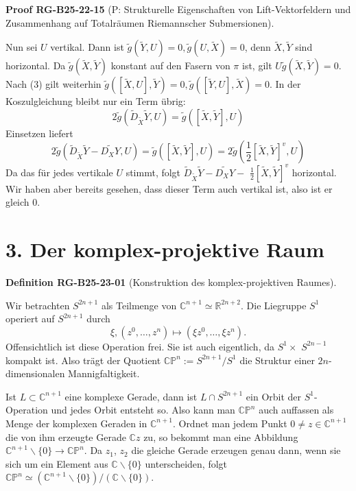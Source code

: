 \documentclass[10pt, letterpaper]{article}
\newcommand{\CustomHeading}[3]{%
  \par\medskip\noindent%
  \textbf{#1 #2} \textnormal{(#3)}.\enskip%
}
\newenvironment{DEF}[2]{\begin{unitbox}\CustomHeading{Definition}{#1}{#2}}{\end{unitbox}}
\newenvironment{PROOF}[2]{\begin{unitbox}\CustomHeading{Proof}{#1}{#2}}{\end{unitbox}}
\begin{document}
\begin{PROOF}{RG-B25-22-15}{P: Strukturelle Eigenschaften von Lift-Vektorfeldern und Zusammenhang auf Totalräumen Riemannscher Submersionen}
Nun sei $U$ vertikal. Dann ist $\tilde{g}(\tilde{Y}, U)=0, \tilde{g}(U, \tilde{X})=0$, denn $\tilde{X}, \tilde{Y}$ sind horizontal. Da $\tilde{g}(\tilde{X}, \tilde{Y})$ konstant auf den Fasern von $\pi$ ist, gilt $U \tilde{g}(\tilde{X}, \tilde{Y})=0$. Nach (3) gilt weiterhin $\tilde{g}([\tilde{X}, U], \tilde{Y})=0, \tilde{g}([\tilde{Y}, U], \tilde{X})=0$. In der Koszulgleichung bleibt nur ein Term übrig:
$$
2 \tilde{g}\left(\tilde{D}_{\tilde{X}} \tilde{Y}, U\right)=\tilde{g}([\tilde{X}, \tilde{Y}], U)
$$
Einsetzen liefert
$$
2 \tilde{g}\left(\tilde{D}_{\tilde{X}} \tilde{Y}-\widetilde{D_{X} Y}, U\right)=\tilde{g}([\tilde{X}, \tilde{Y}], U)=2 \tilde{g}\left(\frac{1}{2}[\tilde{X}, \tilde{Y}]^{v}, U\right)
$$
Da das für jedes vertikale $U$ stimmt, folgt $\tilde{D}_{\tilde{X}} \tilde{Y}-\widetilde{D_{X} Y}-$ $\frac{1}{2}[\tilde{X}, \tilde{Y}]^{v}$ horizontal. Wir haben aber bereits gesehen, dass dieser Term auch vertikal ist, also ist er gleich 0.
\end{PROOF}




\pagebreak



\section*{3. Der komplex-projektive Raum}



\begin{DEF}{RG-B25-23-01}{Konstruktion des komplex-projektiven Raumes}
Wir betrachten $S^{2 n+1}$ als Teilmenge von $\mathbb{C}^{n+1} \simeq \mathbb{R}^{2 n+2}$. Die Liegruppe $S^{1}$ operiert auf $S^{2 n+1}$ durch
$$
\xi,\left(z^{0}, \ldots, z^{n}\right) \mapsto\left(\xi z^{0}, \ldots, \xi z^{n}\right) .
$$
Offensichtlich ist diese Operation frei. Sie ist auch eigentlich, da $S^{1} \times$ $S^{2 n-1}$ kompakt ist. Also trägt der Quotient $\mathbb{C} \mathbb{P}^{n}:=S^{2 n+1} / S^{1}$ die Struktur einer $2 n$-dimensionalen Mannigfaltigkeit.


Ist $L \subset \mathbb{C}^{n+1}$ eine komplexe Gerade, dann ist $L \cap S^{2 n+1}$ ein Orbit der $S^{1}$-Operation und jedes Orbit entsteht so. Also kann man $\mathbb{C P}^{n}$ auch auffassen als Menge der komplexen Geraden in $\mathbb{C}^{n+1}$. Ordnet man jedem Punkt $0 \neq z \in \mathbb{C}^{n+1}$ die von ihm erzeugte Gerade $\mathbb{C} z$ zu, so bekommt man eine Abbildung $\mathbb{C}^{n+1} \backslash\{0\} \rightarrow \mathbb{C} \mathbb{P}^{n}$. Da $z_{1}$, $z_{2}$ die gleiche Gerade erzeugen genau dann, wenn sie sich um ein Element aus $\mathbb{C} \backslash\{0\}$ unterscheiden, folgt $\mathbb{C P}^{n} \simeq\left(\mathbb{C}^{n+1} \backslash\{0\}\right) /(\mathbb{C} \backslash\{0\})$.
\end{DEF}
\end{document}
